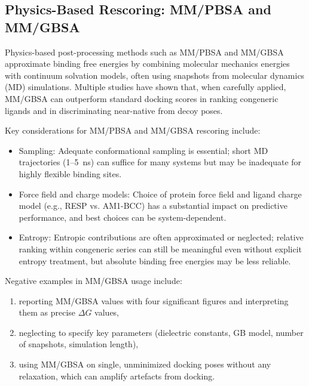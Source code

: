 \documentclass[12pt,a4paper]{article}
\begin{document}
\subsection{Physics-Based Rescoring: MM/PBSA and MM/GBSA}

Physics-based post-processing methods such as MM/PBSA and MM/GBSA approximate binding free energies by combining molecular mechanics energies with continuum solvation models, often using snapshots from molecular dynamics (MD) simulations.\cite{CH8_Hou2011,CH8_MMGBSApose2011,CH8_MMGBSAreview2015} Multiple studies have shown that, when carefully applied, MM/GBSA can outperform standard docking scores in ranking congeneric ligands and in discriminating near-native from decoy poses.\cite{CH8_Hou2011,CH8_MMGBSApose2011,CH8_MMGBSAffinity2016,CH8_Xu2013}

Key considerations for MM/PBSA and MM/GBSA rescoring include:

\begin{itemize}
  \item Sampling: Adequate conformational sampling is essential; short MD trajectories (1–5~ns) can suffice for many systems but may be inadequate for highly flexible binding sites.\cite{CH8_Hou2011,CH8_Xu2013}
  \item Force field and charge models: Choice of protein force field and ligand charge model (e.g., RESP vs. AM1-BCC) has a substantial impact on predictive performance, and best choices can be system-dependent.\cite{CH8_Xu2013,CH8_MMGBSAreview2015}
  \item Entropy: Entropic contributions are often approximated or neglected; relative ranking within congeneric series can still be meaningful even without explicit entropy treatment, but absolute binding free energies may be less reliable.
\end{itemize}

Negative examples in MM/GBSA usage include:

\begin{enumerate}
  \item reporting MM/GBSA values with four significant figures and interpreting them as precise $\Delta G$ values,
  \item neglecting to specify key parameters (dielectric constants, GB model, number of snapshots, simulation length),
  \item using MM/GBSA on single, unminimized docking poses without any relaxation, which can amplify artefacts from docking.
\end{enumerate}
\end{document}
